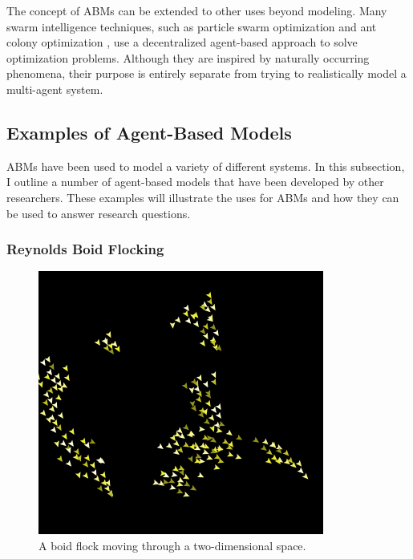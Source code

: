 The concept of ABMs can be extended to other uses beyond modeling.
Many swarm intelligence techniques, such as particle swarm optimization \cite{kennedy1995pso} and ant colony optimization \cite{dorigo2004aco}, use a decentralized agent-based approach to solve optimization problems.
Although they are inspired by naturally occurring phenomena, their purpose is entirely separate from trying to realistically model a multi-agent system.




\subsection{Examples of Agent-Based Models}

ABMs have been used to model a variety of different systems.
In this subsection, I outline a number of agent-based models that have been developed by other researchers.
These examples will illustrate the uses for ABMs and how they can be used to answer research questions.


\subsubsection{Reynolds Boid Flocking}

\begin{figure}[ht]
\centering
\includegraphics[scale=.66667]{images/netlogo_boidflock.png}
\caption{A boid flock moving through a two-dimensional space.}
\label{fig:netlogoboids}
\end{figure}

